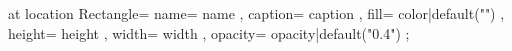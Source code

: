 \pic[shift={ {{- offset -}} }] at {{ location }} {
    Rectangle={
        name={{ name }},
        caption={{ caption }},
        fill={{ color|default("\ConvColor") }},
        height={{ height }},
        width={{ width }},
        opacity={{ opacity|default("0.4") }}
    }
};

